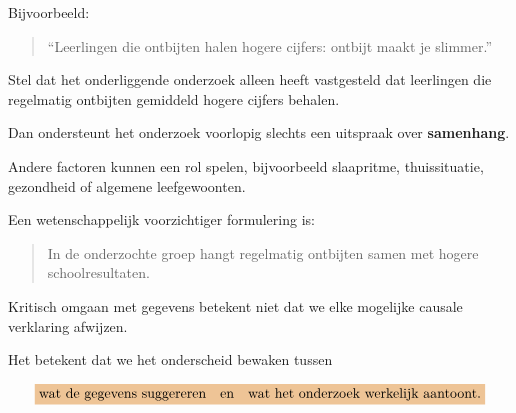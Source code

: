 \documentclass{ximera}
\begin{document}
Bijvoorbeeld:

\begin{quote}
``Leerlingen die ontbijten halen hogere cijfers: ontbijt maakt je
slimmer.''
\end{quote}

Stel dat het onderliggende onderzoek alleen heeft vastgesteld dat
leerlingen die regelmatig ontbijten gemiddeld hogere cijfers behalen.

Dan ondersteunt het onderzoek voorlopig slechts een uitspraak over
\textbf{samenhang}.

Andere factoren kunnen een rol spelen, bijvoorbeeld slaapritme,
thuissituatie, gezondheid of algemene leefgewoonten.

Een wetenschappelijk voorzichtiger formulering is:

\begin{quote}
In de onderzochte groep hangt regelmatig ontbijten samen met hogere
schoolresultaten.
\end{quote}

\begin{opmerking}
Kritisch omgaan met gegevens betekent niet dat we elke mogelijke
causale verklaring afwijzen.

Het betekent dat we het onderscheid bewaken tussen

\[
\important{
\text{wat de gegevens suggereren}
\quad\text{en}\quad
\text{wat het onderzoek werkelijk aantoont}.
}
\]
\end{opmerking}
\end{document}
